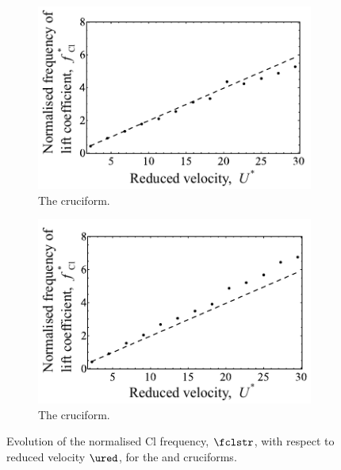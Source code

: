 \documentclass[a4paper,fleqn]{cas-sc}
\begin{document}
\begin{figure}
  \centering
  \begin{subfigure}[h]{0.4\textwidth}
    \includegraphics[width=\textwidth]{figs/clFreq4}
    \caption{The \angfo{} cruciform.}
    \label{fig:clFreq4}
  \end{subfigure}
  \hspace{6mm}
  \begin{subfigure}[h]{0.4\textwidth}
    \includegraphics[width=\textwidth]{figs/clFreq3}
    \caption{The \angth{} cruciform.}
    \label{fig:clFreq3}
  \end{subfigure}

  \label{fig:clFreq43}
  \caption{Evolution of the normalised Cl frequency, $\fclstr$, with respect to reduced velocity $\ured$, for the \angfo{} and \angth{} cruciforms.}
\end{figure}
\end{document}
